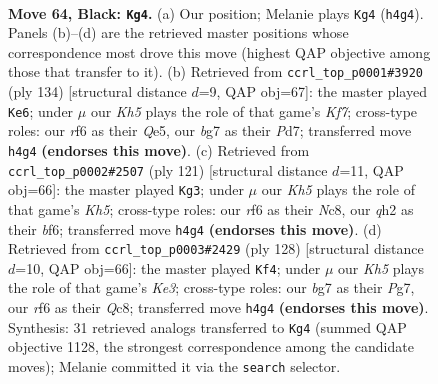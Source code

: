 \documentclass[11pt]{article}
\begin{document}
\clearpage

\begin{figure}[p]\centering
\begin{subfigure}{0.46\textwidth}\centering
\resizebox{\linewidth}{!}{%
\newchessgame
\chessboard[
  setfen={8/P5B1/5R2/8/3K3k/8/7Q/8 b - - 2 64},
  showmover=false,
  pgfstyle=straightmove, color=movearrow, markmove={h4-g4}
]}
\caption{}
\end{subfigure}\hfill
\begin{subfigure}{0.46\textwidth}\centering
\resizebox{\linewidth}{!}{%
\newchessgame
\chessboard[
  setfen={8/1k1P1K1q/8/4Q3/p7/8/8/8 w - - 5 68},
  showmover=false,
  pgfstyle=straightmove, color=movearrow, markmove={f7-e6}
]}
\caption{}
\end{subfigure}
\\[4pt]
\begin{subfigure}{0.46\textwidth}\centering
\resizebox{\linewidth}{!}{%
\newchessgame
\chessboard[
  setfen={2n5/8/5B2/1P6/p6k/8/3K4/8 b - - 6 61},
  showmover=false,
  pgfstyle=straightmove, color=movearrow, markmove={h4-g3}
]}
\caption{}
\end{subfigure}\hfill
\begin{subfigure}{0.46\textwidth}\centering
\resizebox{\linewidth}{!}{%
\newchessgame
\chessboard[
  setfen={2Q5/4k1P1/8/8/8/4K3/p7/4q3 w - - 3 65},
  showmover=false,
  pgfstyle=straightmove, color=movearrow, markmove={e3-f4}
]}
\caption{}
\end{subfigure}
\caption{\textbf{Move 64, Black: \texttt{Kg4}.} (a) Our position; Melanie plays \texttt{Kg4} (\texttt{h4g4}). Panels (b)--(d) are the retrieved master positions whose correspondence most drove this move (highest QAP objective among those that transfer to it). (b) Retrieved from \texttt{ccrl\_top\_p0001\#3920} (ply 134) [structural distance $d$=9, QAP obj=67]: the master played \texttt{Ke6}; under $\mu$ our \emph{Kh5} plays the role of that game's \emph{Kf7}; cross-type roles: our \emph{r}f6 as their \emph{Q}e5, our \emph{b}g7 as their \emph{P}d7; transferred move \texttt{h4g4} \textbf{(endorses this move)}. (c) Retrieved from \texttt{ccrl\_top\_p0002\#2507} (ply 121) [structural distance $d$=11, QAP obj=66]: the master played \texttt{Kg3}; under $\mu$ our \emph{Kh5} plays the role of that game's \emph{Kh5}; cross-type roles: our \emph{r}f6 as their \emph{N}c8, our \emph{q}h2 as their \emph{b}f6; transferred move \texttt{h4g4} \textbf{(endorses this move)}. (d) Retrieved from \texttt{ccrl\_top\_p0003\#2429} (ply 128) [structural distance $d$=10, QAP obj=66]: the master played \texttt{Kf4}; under $\mu$ our \emph{Kh5} plays the role of that game's \emph{Ke3}; cross-type roles: our \emph{b}g7 as their \emph{P}g7, our \emph{r}f6 as their \emph{Q}c8; transferred move \texttt{h4g4} \textbf{(endorses this move)}. Synthesis: 31 retrieved analogs transferred to \texttt{Kg4} (summed QAP objective 1128, the strongest correspondence among the candidate moves); Melanie committed it via the \texttt{search} selector.}
\label{fig:thought-m127}
\end{figure}
\end{document}
